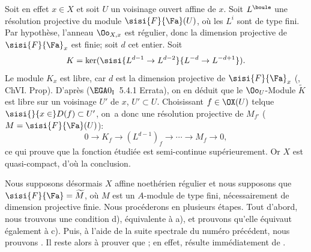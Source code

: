 \setcounter{equation}{1}

Soit en effet $x\in X$ et soit $U$ un voisinage ouvert affine de $x$. Soit $L^\boule$ une r\'esolution projective du module $\sisi{F}{{\Fa}}(U)$, o\`u les $L^i$ sont de type fini. Par hypoth\`ese, l'anneau $\Oo_{X, x}$ est r\'egulier, donc la dimension projective de $\sisi{F}{{\Fa}}_x$ est finie; soit $d$ cet entier. Soit
\[
K=\ker(\sisi{L^{d-1}\to L^{d-2}}{L^{-d}\to L^{-d+1}}).
\]
Le module $K_x$ est libre, car $d$ est la dimension projective de $\sisi{F}{{\Fa}}_x$ (, Ch\ptbl VI. Prop). D'apr\`es ($\EGA 0_{\textup{I}}$~5.4.1 Errata), on en d\'eduit que le $\Oo_U$-Module $\widetilde{K}$ est libre sur un voisinage $U'$ de $x$, $U'\subset U$. Choisissant $f\in \OX(U)$ tel\pageoriginale que $\sisi{}{x\in}D(f)\subset U'$, on~a donc une r\'esolution projective de $M_{f'}$ ($M=\sisi{F}{{\Fa}}(U)$):
\[0\to K_f \to (L^{d-1})_f\to \cdots \to M_f\to 0, \]
ce qui prouve que la fonction \'etudi\'ee est semi-continue sup\'erieurement. Or $X$ est quasi-compact, d'o\`u la conclusion.

Nous supposons d\'esormais $X$ affine noeth\'erien r\'egulier et nous supposons que \hbox{$\sisi{F}{{\Fa}}=\widetilde{M}$}, o\`u $M$ est un $A$-module de type fini, n\'ecessairement de dimension projective finie. Nous proc\'ederons en plusieurs \'etapes. Tout d'abord, nous trouvons une condition d), \'equivalente \`a a), et prouvons qu'elle \'equivaut \'egalement \`a c). Puis, \`a l'aide de la suite spectrale du num\'ero pr\'ec\'edent, nous prouvons \ALORS{}. Il reste alors \`a prouver que \ALORS{}; en effet, \SSI{}\ALORS{} r\'esulte imm\'ediatement de \SSI{}\ALORS{}.

